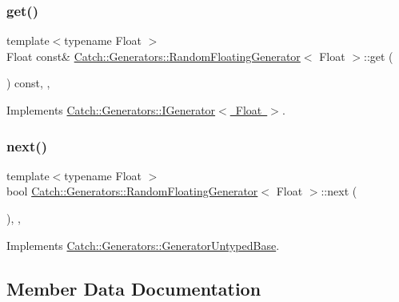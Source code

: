 \subsubsection{\texorpdfstring{get()}{get()}}
{\footnotesize\ttfamily template$<$typename Float $>$ \\
Float const\& \mbox{\hyperlink{class_catch_1_1_generators_1_1_random_floating_generator}{Catch\+::\+Generators\+::\+Random\+Floating\+Generator}}$<$ Float $>$\+::get (\begin{DoxyParamCaption}{ }\end{DoxyParamCaption}) const\hspace{0.3cm}{\ttfamily [inline]}, {\ttfamily [override]}, {\ttfamily [virtual]}}



Implements \mbox{\hyperlink{struct_catch_1_1_generators_1_1_i_generator_a525d381fc9249a885b075a0632a8579a}{Catch\+::\+Generators\+::\+I\+Generator$<$ Float $>$}}.

\mbox{\label{class_catch_1_1_generators_1_1_random_floating_generator_a6a65e5f16abd884f58c31581b2a0d6db}} 
\subsubsection{\texorpdfstring{next()}{next()}}
{\footnotesize\ttfamily template$<$typename Float $>$ \\
bool \mbox{\hyperlink{class_catch_1_1_generators_1_1_random_floating_generator}{Catch\+::\+Generators\+::\+Random\+Floating\+Generator}}$<$ Float $>$\+::next (\begin{DoxyParamCaption}{ }\end{DoxyParamCaption})\hspace{0.3cm}{\ttfamily [inline]}, {\ttfamily [override]}, {\ttfamily [virtual]}}



Implements \mbox{\hyperlink{class_catch_1_1_generators_1_1_generator_untyped_base_aeed3c0cd6233c5f553549e453b8d6638}{Catch\+::\+Generators\+::\+Generator\+Untyped\+Base}}.



\subsection{Member Data Documentation}
\mbox{\label{class_catch_1_1_generators_1_1_random_floating_generator_a3591690761d8da0f4438623a453e6bc0}} 
